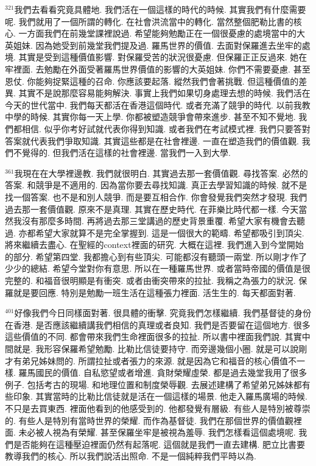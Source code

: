 \documentclass{book}
\begin{document}
$^{321}$我們去看看究竟具體地.
我們活在一個這樣的時代的時候.
其實我們有什麼需要呢.
我們就用了一個所謂的轉化.
在社會洪流當中的轉化.
當然整個肥勒比書的核心.
一方面我們在前幾堂課裡說過.
希望能夠勉勵正在一個很憂慮的處境當中的大英姐妹.
因為她受到前幾堂我們提及過.
羅馬世界的價值.
去面對保羅進去坐牢的處境.
其實是受到這種價值影響.
對保羅受苦的狀況很憂慮.
但保羅正正反過來.
她在牢裡面.
去勉勵在外面受著羅馬世界價值的影響的大英姐妹.
你們不需要憂慮.
甚至恩仗.
你能夠捉緊這種的召命.
你應該要起落.
縱然我們會著挑戰.
但這種價值的差異.
其實不是說那麼容易能夠解決.
事實上我們如果切身處理去想的時候.
我們活在今天的世代當中.
我們每天都活在香港這個時代.
或者充滿了競爭的時代.
以前我教中學的時候.
其實你每一天上學.
你都被塑造競爭會帶來進步.
甚至不知不覺地.
我們都相信.
似乎你考好試就代表你得到知識.
或者我們在考試模式裡.
我們只要答對答案就代表我們爭取知識.
其實這些都是在社會裡邊.
一直在塑造我們的價值觀.
我們不覺得的.
但我們活在這樣的社會裡邊.
當我們一入到大學.

$^{361}$我現在在大學裡邊教.
我們就很明白.
其實過去那一套價值觀.
尋找答案.
必然的答案.
和競爭是不適用的.
因為當你要去尋找知識.
真正去學習知識的時候.
就不是找一個答案.
也不是和別人競爭.
而是要互相合作.
你會發覺我們突然才發現.
我們過去那一套價值觀.
原來不是真理.
其實在歷史時代.
在菲樂比時代都一樣.
今天當然我沒有那麼多時間.
再將過去那三堂講過的歷史背景重覆.
希望大家有機會去聽過.
亦都希望大家就算不是完全掌握到.
這是一個很大的範疇.
希望都吸引到頂尖.
將來繼續去盡心.
在聖經的context裡面的研究.
大概在這裡.
我們進入到今堂開始的部分.
希望第四堂.
我都擔心到有些頂尖.
可能都沒有聽頭一兩堂.
所以剛才作了少少的總結.
希望今堂對你有意思.
所以在一種羅馬世界.
或者當時帝國的價值是很完整的.
和福音很明顯是有衝突.
或者由衝突帶來的拉扯.
我稱之為張力的狀況.
保羅就是要回應.
特別是勉勵一班生活在這種張力裡面.
活生生的.
每天都面對著.

$^{401}$好像我們今日同樣面對著.
很具體的衝擊.
究竟我們怎樣繼續.
我們基督徒的身份在香港.
是否應該繼續講我們相信的真理或者良知.
我們是否要留在這個地方.
很多這些價值的不同.
都會帶來我們生命裡面很多的拉扯.
所以書中裡面我們說.
其實中間就是.
我形容保羅希望勉勵.
比勒比信徒要持守.
而旁邊幾個小圈.
就是可以說剛才有弟兄姊妹問的.
所謂拉扯或者張力的來源.
就是因為它和福音的核心價值不一樣.
羅馬國民的價值.
自私慾望或者增進.
貪財榮耀虛榮.
都是過去幾堂我用了很多例子.
包括考古的現場.
和地理位置和制度榮辱觀.
去展述建構了希望弟兄姊妹都有些印象.
其實當時的比勒比信徒就是活在一個這樣的場景.
他走入羅馬廣場的時候.
不只是去買東西.
裡面他看到的他感受到的.
他都發覺有層級.
有些人是特別被尊崇的.
有些人是特別有當時世界的榮耀.
而作為基督徒.
我們在那個世界的價值觀裡面.
未必被人視為有榮耀.
甚至保羅坐牢是被視為羞辱.
我們怎樣看這個處境呢.
我們是否能夠在這種壓迫裡面仍然有起落呢.
這個就是我們一直去建構.
肥立比書要教導我們的核心.
所以我們說活出照命.
不是一個純粹我們平時以為.
\end{document}
